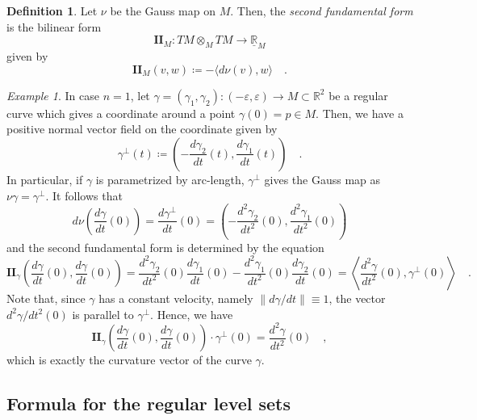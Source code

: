 \documentclass[pdftex,a4paper,12pt]{scrartcl}
\theoremstyle{plain}
\theoremstyle{definition}
\newtheorem*{definition}{Definition}
\theoremstyle{remark}
\newtheorem{example}[theorem]{Example}
\begin{document}
\begin{definition}
Let $\nu$ be the Gauss map on $M$.
Then, the \emph{second fundamental form} is the bilinear form
\[
\mathbf{II}_M:TM\otimes_M TM\to\underline{\mathbb R}_M
\]
given by
\[
\mathbf{II}_M(v,w)
\coloneqq -\langle d\nu(v),w\rangle
\quad.
\]
\end{definition}

\begin{example}
In case $n=1$, let $\gamma=(\gamma_1,\gamma_2):(-\varepsilon,\varepsilon)\to M\subset\mathbb R^2$ be a regular curve which gives a coordinate around a point $\gamma(0)=p\in M$.
Then, we have a positive normal vector field on the coordinate given by
\[
\gamma^\perp(t)\coloneqq \left(-\frac{d\gamma_2}{dt}(t),\frac{d\gamma_1}{dt}(t)\right)
\quad.
\]
In particular, if $\gamma$ is parametrized by arc-length, $\gamma^\perp$ gives the Gauss map as $\nu\gamma=\gamma^\perp$.
It follows that
\[
d\nu\left(\frac{d\gamma}{dt}(0)\right)
= \frac{d\gamma^\perp}{dt}(0)
= \left(-\frac{d^2\gamma_2}{dt^2}(0),\frac{d^2\gamma_1}{dt^2}(0)\right)
\]
and the second fundamental form is determined by the equation
\[
\mathbf{II}_\gamma\left(\frac{d\gamma}{dt}(0),\frac{d\gamma}{dt}(0)\right)
= \frac{d^2\gamma_2}{dt^2}(0)\frac{d\gamma_1}{dt}(0) - \frac{d^2\gamma_1}{dt^2}(0)\frac{d\gamma_2}{dt}(0)
= \left\langle \frac{d^2\gamma}{dt^2}(0), \gamma^\perp(0)\right\rangle
\quad.
\]
Note that, since $\gamma$ has a constant velocity, namely $\|d\gamma/dt\|\equiv1$, the vector $d^2\gamma/dt^2(0)$ is parallel to $\gamma^\perp$.
Hence, we have
\[
\mathbf{II}_\gamma\left(\frac{d\gamma}{dt}(0),\frac{d\gamma}{dt}(0)\right)\cdot\gamma^\perp(0)
= \frac{d^2\gamma}{dt^2}(0)
\quad,
\]
which is exactly the curvature vector of the curve $\gamma$.
\end{example}

\subsection{Formula for the regular level sets}
\end{document}
